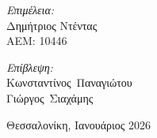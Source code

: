 \documentclass[a4paper,12 pt,oneside]{report}
\begin{document}
\begin{titlepage}
\begin{center}
		\begin{minipage}[t][4cm][t]{0.45\textwidth}
			\raggedright
			\large
			\textit{Επιμέλεια:} \\
			Δημήτριος Ντέντας \\
			ΑΕΜ: 10446
		\end{minipage}%
		\hfill
		\begin{minipage}[t][4cm][t]{0.45\textwidth}
			\raggedleft
			\large
			\textit{Επίβλεψη:} \\
			Κωνσταντίνος~Παναγιώτου \\
			Γιώργος~Σιαχάμης
		\end{minipage}

		\vspace{2cm}

		\begin{center}
			{\large Θεσσαλονίκη, Ιανουάριος 2026}
		\end{center}
	\end{center}
\end{titlepage}



\sloppy

\tableofcontents

\newevenside
{}















\newevenside
\renewcommand{\bibname}{Βιβλιογραφία}

\end{document}
